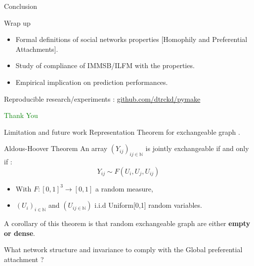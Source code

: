 \begin{frame}[c]{Conclusion}
    \begin{block}{Wrap up}
    \begin{itemize}
        \item Formal definitions of social networks properties [Homophily and Preferential Attachments].
        \item Study of compliance of IMMSB/ILFM with the properties.
        \item Empirical implication on prediction performances.
    \end{itemize}
    \end{block}



    
    \vspace{2em}
     Reproducible research/experiments : \hyperlink{http://github.com/dtrckk/pymake}{github.com/dtrckd/pymake}

    \pause
    \vspace{1em}
    \textcolor{green}{Thank You}
\end{frame}

%
%
%
%
%
%
%
%
%

\begin{frame}[c]{Limitation and future work}
    Representation Theorem for exchangeable graph .

    \begin{block}{Aldous-Hoover Theorem}
        An array $(Y_{ij})_{{ij}\in \mathbb{N}}$ is jointly exchangeable if and only if :
    \begin{equation}
        Y_{ij} \sim F(U_i, U_j, U_{ij})
    \end{equation}

    \begin{itemize}
        \item With $F: [0,1]^3 \rightarrow [0,1]$ a random measure, 
        \item  $(U_i)_{i\in \mathbb{N}}$ and $(U_{{ij}\in \mathbb{N}})$   i.i.d Uniform[0,1] random variables.
    \end{itemize}
    \end{block}

    A corollary of this theorem is that random exchangeable graph are either \textbf{empty or dense}.
    \vspace{1cm}

    \MVRightarrow{} What network structure and invariance to comply with the Global preferential attachment ?

\end{frame}


